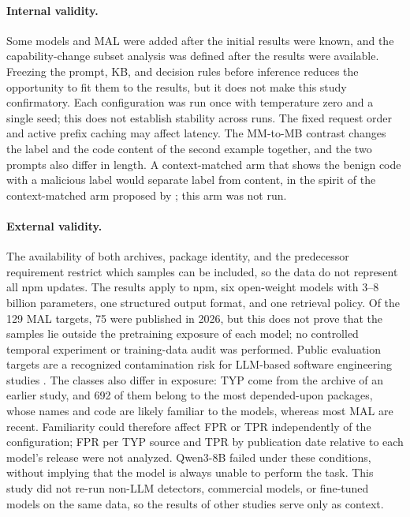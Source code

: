 \documentclass[a4paper,fleqn]{cas-dc}
\begin{document}
\paragraph{Internal validity.}
Some models and MAL were added after the initial results were known, and the
capability-change subset analysis was defined after the results were available.
Freezing the prompt, KB, and decision rules before inference reduces the
opportunity to fit them to the results, but it does not make this study
confirmatory. Each configuration was run once with temperature zero and a single
seed; this does not establish stability across runs. The fixed request order and
active prefix caching may affect latency. The MM-to-MB contrast changes the label
and the code content of the second example together, and the two prompts also
differ in length. A context-matched arm that shows the benign code with a
malicious label would separate label from content, in the spirit of the
context-matched arm proposed by \citet{malhotra2027llm}; this arm was not run.

\paragraph{External validity.}
The availability of both archives, package identity, and the predecessor
requirement restrict which samples can be included, so the data do not represent
all npm updates. The results apply to npm, six open-weight models with
3--8 billion parameters, one structured output format, and one retrieval policy.
Of the 129 MAL targets, 75 were published in 2026, but this does not prove that
the samples lie outside the pretraining exposure of each model; no controlled
temporal experiment or training-data audit was performed. Public evaluation
targets are a recognized contamination risk for LLM-based software engineering
studies \citep{malhotra2027llm}. The classes also differ in exposure: TYP come
from the archive of an earlier study, and 692 of them belong to the most
depended-upon packages, whose names and code are likely familiar to the models,
whereas most MAL are recent. Familiarity could therefore affect FPR or TPR
independently of the configuration; FPR per TYP source and TPR by publication date
relative to each model's release were not analyzed. Qwen3-8B failed under
these conditions, without implying that the model is always unable to perform the
task. This study did not re-run non-LLM detectors, commercial models, or
fine-tuned models on the same data, so the results of other studies serve only as
context.
\end{document}
